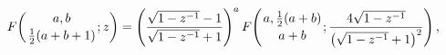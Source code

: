 \[\mathop{F\/}\nolimits\!\left({a,b\atop\tfrac{1}{2}(a+b+1)};z\right)=\left(%
\frac{\sqrt{1-z^{-1}}-1}{\sqrt{1-z^{-1}}+1}\right)^{a}\mathop{F\/}\nolimits\!%
\left({a,\tfrac{1}{2}(a+b)\atop a+b};\frac{4\sqrt{1-z^{-1}}}{\left(\sqrt{1-z^{%
-1}}+1\right)^{2}}\right),\]